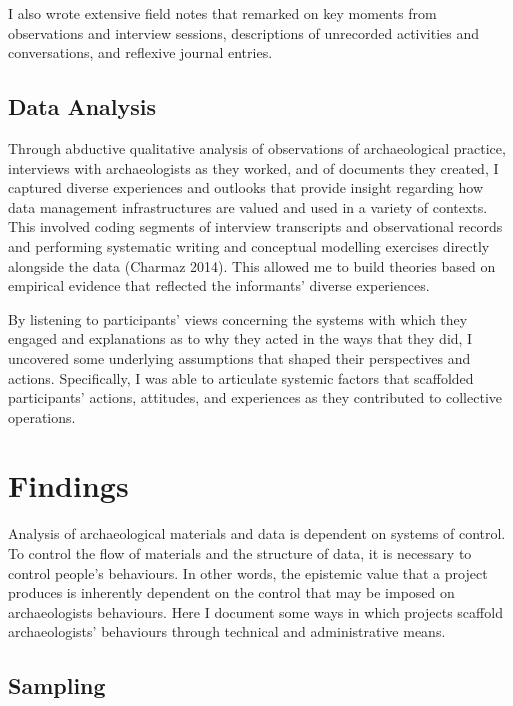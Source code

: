 \documentclass[
  canadian,
]{article}
\begin{document}
I also wrote extensive field notes that remarked on key moments from
observations and interview sessions, descriptions of unrecorded
activities and conversations, and reflexive journal entries.

\subsection{Data Analysis}\label{data-analysis}

Through abductive qualitative analysis of observations of archaeological
practice, interviews with archaeologists as they worked, and of
documents they created, I captured diverse experiences and outlooks that
provide insight regarding how data management infrastructures are valued
and used in a variety of contexts. This involved coding segments of
interview transcripts and observational records and performing
systematic writing and conceptual modelling exercises directly alongside
the data (Charmaz 2014). This allowed me to build theories based on
empirical evidence that reflected the informants' diverse experiences.

By listening to participants' views concerning the systems with which
they engaged and explanations as to why they acted in the ways that they
did, I uncovered some underlying assumptions that shaped their
perspectives and actions. Specifically, I was able to articulate
systemic factors that scaffolded participants' actions, attitudes, and
experiences as they contributed to collective operations.

\section{Findings}\label{findings}

Analysis of archaeological materials and data is dependent on systems of
control. To control the flow of materials and the structure of data, it
is necessary to control people's behaviours. In other words, the
epistemic value that a project produces is inherently dependent on the
control that may be imposed on archaeologists behaviours. Here I
document some ways in which projects scaffold archaeologists' behaviours
through technical and administrative means.

\subsection{Sampling}\label{sampling}
\end{document}
